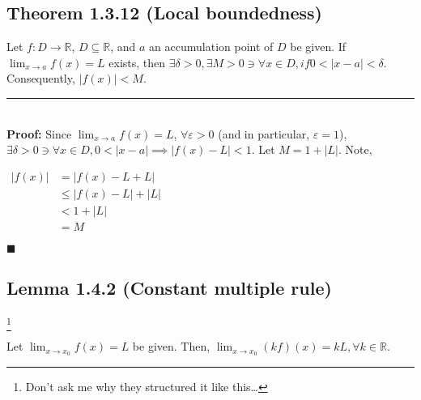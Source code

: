 \documentclass[11pt]{book}
\newcommand{\R}{\mathbb{R}}
\newcommand{\horline}{\noindent\rule{14.25cm}{0.6pt}\\}
\newcommand{\QED}{\begin{flushright}$\blacksquare$\end{flushright}}
\begin{document}
	\subsection{Theorem 1.3.12 (Local boundedness)}
	\label{subsec:theor1312}
		\begin{theor}
			Let $f: D \to \R$, $D \subseteq \R$, and $a$ an accumulation point of $D$ be given. If $\displaystyle\lim_{x \to a}{f(x) = L}$
			exists, then $\exists \delta > 0, \exists M > 0 \ni \forall x \in D, if 0 < |x - a| < \delta$. Consequently, 
			$|f(x)| < M$.\\
			\horline
			\textbf{Proof:} Since $\displaystyle\lim_{x \to a}{f(x) = L}$, $\forall \varepsilon > 0$ (and in particular, $\varepsilon = 1$), $\exists \delta > 0 \ni
			\forall x \in D, 0 < | x - a| \implies |f(x) - L| < 1$. Let $M = 1 + |L|$. Note,
			\begin{center}
				\begin{math}
					\begin{aligned}
						|f(x)| &  = |f(x) - L + L|\\
						& \leq |f(x) - L| + |L|\\
						& < 1+ |L|\\
						& = M
					\end{aligned}
				\end{math}
			\end{center}
			\QED
		\end{theor}
	\newpage
	\subsection{Lemma 1.4.2 (Constant multiple rule)}\footnote{Don't ask me why they structured it like this\dots}
		\begin{lemm}
			Let $\displaystyle\lim_{x \to x_0}{f(x) = L}$ be given. Then, $\displaystyle\lim_{x \to x_0}{(kf)(x) = kL}, \forall k \in \R$.
		\end{lemm}
\end{document}

